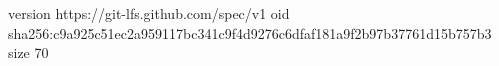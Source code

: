 version https://git-lfs.github.com/spec/v1
oid sha256:c9a925c51ec2a959117bc341c9f4d9276c6dfaf181a9f2b97b37761d15b757b3
size 70
